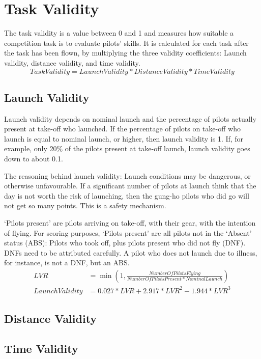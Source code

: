 \documentclass{article}
\begin{document}
\newpage
\section{Task Validity}
The task validity is a value between 0 and 1 and measures how suitable a competition task is to evaluate
pilots’ skills. It is calculated for each task after the task has been flown, by multiplying the three validity
coefficients: Launch validity, distance validity, and time validity.
\begin{equation*}
    TaskValidity = LaunchValidity * DistanceValidity * TimeValidity
\end{equation*}

\subsection{Launch Validity}
Launch validity depends on nominal launch and the percentage of pilots actually present at take-off who
launched. If the percentage of pilots on take-off who launch is equal to nominal launch, or higher, then
launch validity is 1. If, for example, only 20\% of the pilots present at take-off launch, launch validity goes
down to about 0.1.

The reasoning behind launch validity: Launch conditions may be dangerous, or otherwise unfavourable.
If a significant number of pilots at launch think that the day is not worth the risk of launching, then the
gung-ho pilots who did go will not get so many points. This is a safety mechanism.

‘Pilots present’ are pilots arriving on take-off, with their gear, with the intention of flying. For scoring
purposes, ‘Pilots present’ are all pilots not in the ‘Absent’ status (ABS): Pilots who took off, plus pilots
present who did not fly (DNF). DNFs need to be attributed carefully. A pilot who does not launch due to
illness, for instance, is not a DNF, but an ABS.
\begin{align*}
    LVR &= \min(1, \frac{NumberOfPilotsFlying}{NumberOfPilotsPresent * NominalLaunch}) \\
    LaunchValidity &= 0.027 * LVR + 2.917 * LVR^2 - 1.944 * LVR^3
\end{align*}

\subsection{Distance Validity}
\subsection{Time Validity}
\end{document}
